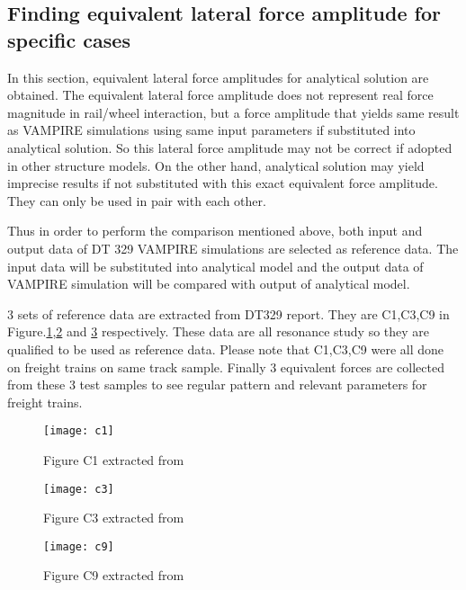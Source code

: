 \subsection{Finding equivalent lateral force amplitude for specific cases}\label{sec:findingequivalentamplitude}
In this section, equivalent lateral force amplitudes for analytical solution are obtained. The equivalent lateral force amplitude does not represent real force magnitude in rail/wheel interaction, but a force amplitude that yields same result as VAMPIRE simulations using same input parameters if substituted into analytical solution. So this lateral force amplitude may not be correct if adopted in other structure models. On the other hand, analytical solution may yield imprecise results if not substituted with this exact equivalent force amplitude. They can only be used in pair with each other.

Thus in order to perform the comparison mentioned above, both input and output data of DT 329 VAMPIRE simulations are selected as reference data. The input data will be substituted into analytical model and the output data of VAMPIRE simulation will be compared with output of analytical model. 

3 sets of reference data are extracted from DT329 report. They are C1,C3,C9 in Figure.\ref{fig:c1},\ref{fig:c3} and \ref{fig:c9} respectively. These data are all resonance study so they are qualified to be used as reference data. Please note that C1,C3,C9 were all done on freight trains on same track sample. Finally 3 equivalent forces are collected from these 3 test samples to see regular pattern and relevant parameters for freight trains.

\begin{figure}[h!]
    \centering
    \texttt{[image: c1]}
    \caption{Figure C1 extracted from \cite{d181dt329} }
    \label{fig:c1}
\end{figure}

\begin{figure}[h!]
    \centering
    \texttt{[image: c3]}
    \caption{Figure C3 extracted from \cite{d181dt329} }
    \label{fig:c3}
\end{figure}

\begin{figure}[h!]
    \centering
    \texttt{[image: c9]}
    \caption{Figure C9 extracted from \cite{d181dt329} }
    \label{fig:c9}
\end{figure}

